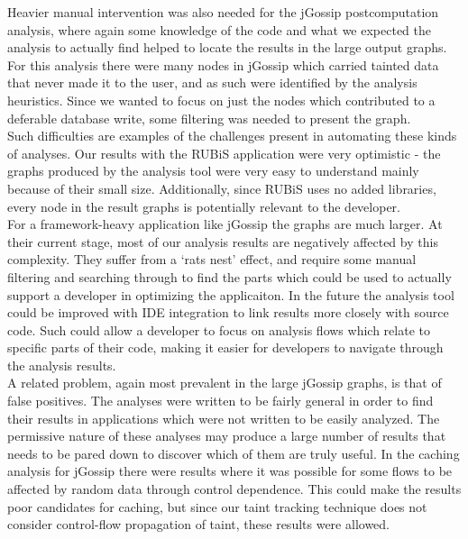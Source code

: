 \documentclass[msc,oneside]{ubcthesis}
\begin{document}
Heavier manual intervention was also needed for the jGossip postcomputation analysis, where again some knowledge of the code and what we expected the analysis to actually find helped to locate the results in the large output graphs. For this analysis there were many nodes in jGossip which carried tainted data that never made it to the user, and as such were identified by the analysis heuristics. Since we wanted to focus on just the nodes which contributed to a deferable database write, some filtering was needed to present the graph.\\

Such difficulties are examples of the challenges present in automating these kinds of analyses. Our results with the RUBiS application were very optimistic - the graphs produced by the analysis tool were very easy to understand mainly because of their small size. Additionally, since RUBiS uses no added libraries, every node in the result graphs is potentially relevant to the developer.\\

For a framework-heavy application like jGossip the graphs are much larger. At their current stage, most of our analysis results are negatively affected by this complexity. They suffer from a `rats nest' effect, and require some manual filtering and searching through to find the parts which could be used to actually support a developer in optimizing the applicaiton. In the future the analysis tool could be improved with IDE integration to link results more closely with source code. Such could allow a developer to focus on analysis flows which relate to specific parts of their code, making it easier for developers to navigate through the analysis results.\\

A related problem, again most prevalent in the large jGossip graphs, is that of false positives. The analyses were written to be fairly general in order to find their results in applications which were not written to be easily analyzed. The permissive nature of these analyses may produce a large number of results that needs to be pared down to discover which of them are truly useful. In the caching analysis for jGossip there were results where it was possible for some flows to be affected by random data through control dependence. This could make the results poor candidates for caching, but since our taint tracking technique does not consider control-flow propagation of taint, these results were allowed.\\
\end{document}
